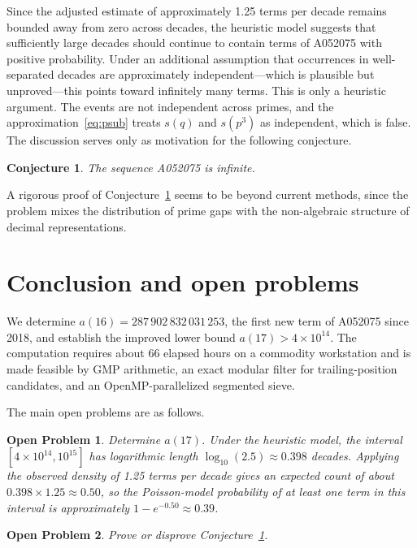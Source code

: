 \documentclass[11pt]{article}
\newtheorem{conjecture}{Conjecture}
\newtheorem{openproblem}{Open Problem}
\theoremstyle{definition}
\theoremstyle{remark}
\begin{document}
Since the adjusted estimate of approximately 1.25 terms per decade
remains bounded away from zero across decades, the heuristic model
suggests that sufficiently large decades should continue to contain
terms of A052075 with positive probability.
Under an additional assumption that occurrences in well-separated
decades are approximately independent---which is plausible but
unproved---this points toward infinitely many terms.
This is only a heuristic argument.
The events are not independent across primes, and the
approximation~\eqref{eq:psub} treats $s(q)$ and $s(p^3)$ as
independent, which is false.
The discussion serves only as motivation for the following conjecture.

\begin{conjecture}
\label{conj:infinite}
The sequence A052075 is infinite.
\end{conjecture}

A rigorous proof of Conjecture~\ref{conj:infinite} seems to be beyond
current methods, since the problem mixes the distribution of prime gaps
with the non-algebraic structure of decimal representations.

\section{Conclusion and open problems}
\label{sec:conclusion}

We determine $a(16) = 287\,902\,832\,031\,253$, the first new term of
A052075 since 2018, and establish the improved lower bound
$a(17) > 4 \times 10^{14}$.
The computation requires about 66 elapsed hours on a commodity
workstation and is made feasible by GMP arithmetic, an exact modular
filter for trailing-position candidates, and an OpenMP-parallelized
segmented sieve.

The main open problems are as follows.

\begin{openproblem}
\label{op:a17}
Determine $a(17)$.
Under the heuristic model, the interval $[4 \times 10^{14}, 10^{15}]$
has logarithmic length $\log_{10}(2.5) \approx 0.398$ decades.
Applying the observed density of 1.25 terms per decade gives an
expected count of about $0.398 \times 1.25 \approx 0.50$, so the
Poisson-model probability of at least one term in this interval
is approximately $1 - e^{-0.50} \approx 0.39$.
\end{openproblem}

\begin{openproblem}
\label{op:infinite}
Prove or disprove Conjecture~\ref{conj:infinite}.
\end{openproblem}
\end{document}
